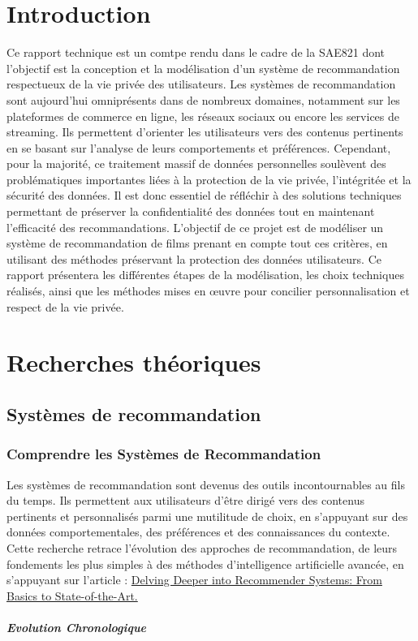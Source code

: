 \documentclass{article}
\begin{document}
\tableofcontents
\newpage

\section*{Introduction}
Ce rapport technique est un comtpe rendu dans le cadre de la SAE821 dont l'objectif est la conception et la modélisation d’un système de recommandation respectueux de la vie privée des utilisateurs. Les systèmes de recommandation sont aujourd’hui omniprésents dans de nombreux domaines, notamment sur les plateformes de commerce en ligne, les réseaux sociaux ou encore les services de streaming. Ils permettent d’orienter les utilisateurs vers des contenus pertinents en se basant sur l’analyse de leurs comportements et préférences.
Cependant, pour la majorité, ce traitement massif de données personnelles soulèvent des problématiques importantes liées à la protection de la vie privée, l'intégritée et la sécurité des données. Il est donc essentiel de réfléchir à des solutions techniques permettant de préserver la confidentialité des données tout en maintenant l’efficacité des recommandations.
L’objectif de ce projet est de modéliser un système de recommandation de films prenant en compte tout ces critères, en utilisant des méthodes préservant la protection des données utilisateurs. Ce rapport présentera les différentes étapes de la modélisation, les choix techniques réalisés, ainsi que les méthodes mises en œuvre pour concilier personnalisation et respect de la vie privée.

\section{Recherches théoriques}
\subsection{Systèmes de recommandation}
\subsubsection{Comprendre les Systèmes de Recommandation}
Les systèmes de recommandation sont devenus des outils incontournables au fils du temps. Ils permettent aux utilisateurs d'être dirigé vers des contenus pertinents et personnalisés parmi une mutilitude de choix, en s'appuyant sur des données comportementales, des préférences et des connaissances du contexte. Cette recherche retrace l'évolution des approches de recommandation, de leurs fondements les plus simples à des méthodes d'intelligence artificielle avancée, en s'appuyant sur l'article : \href{https://medium.com/@eliasah/delving-deeper-into-recommender-systems-from-basics-to-state-of-the-art-d92ee8e277f2}{ Delving Deeper into Recommender Systems: From Basics to State-of-the-Art.}
\subparagraph{Evolution Chronologique}
\end{document}
